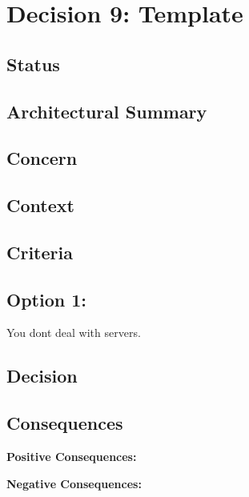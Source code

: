 \section*{Decision 9: Template}

\subsection*{Status}

\subsection*{Architectural Summary}


\subsection*{Concern}


\subsection*{Context}


\subsection*{Criteria}
\begin{itemize}
\end{itemize}

\subsection*{Option 1: }
You dont deal with servers.

\subsection*{Decision}

\subsection*{Consequences}
\textbf{Positive Consequences:}
\begin{itemize}
\end{itemize}
\textbf{Negative Consequences:}
\begin{itemize}
\end{itemize}